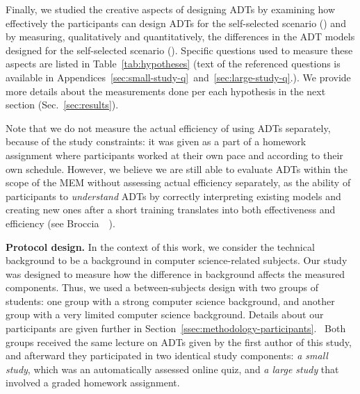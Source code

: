 Finally, we studied the creative aspects of designing ADTs by examining how effectively the participants can design ADTs for the self-selected scenario (\hypothesis{\hypoThirdADTsub}) and by measuring, qualitatively and quantitatively, the differences in the ADT models designed for the self-selected scenario (\hypothesis{\hypoThirdADT}).  Specific questions used to measure these aspects are listed in Table~\ref{tab:hypotheses} (text of the referenced questions is available in Appendices~\ref{sec:small-study-q}~and~\ref{sec:large-study-q}.). We provide more details about the measurements done per each hypothesis in the next section (Sec.~\ref{sec:results}). 

Note that we do not measure the actual efficiency of using ADTs separately, because of the study constraints: it was given as a part of a homework assignment where participants worked at their own pace and according to their own schedule. However, we believe we are still able to evaluate ADTs within the scope of the MEM without assessing actual efficiency separately, as the ability of participants to \emph{understand} ADTs by correctly interpreting existing models and creating new ones after a short training translates into both effectiveness and efficiency (see Broccia~\etal~\cite{broccia_assessing_2024}).


  

\textbf{Protocol design.}
In the context of this work, we consider the technical background to be a background in computer science-related subjects. Our study was designed to measure how the difference in background affects the measured components.  Thus, we used a between-subjects design with two groups of students: one group with a strong computer science background, and another group with a very limited computer science background. Details about our participants are given further in Section~\ref{ssec:methodology-participants}. \ Both groups received the same lecture on ADTs given by the first author of this study, and afterward they participated in two identical study components: \emph{a small study}, which was an automatically assessed online quiz, and \emph{a large study} that involved a graded homework assignment. 

